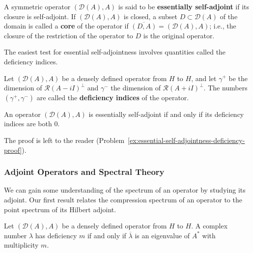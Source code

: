 \begin{Definition}
\label{def:essential-self-adjointness-and-core}
A symmetric operator $(\mathcal{D}(A),A)$ is said to be \textbf{essentially self-adjoint} if its closure is self-adjoint. If $(\mathcal{D}(A),A)$ is closed, a subset $D\subset\mathcal{D}(A)$ of the domain is called a \textbf{core} of the operator if $\overline{(D,A)}=(\mathcal{D}(A),A)$; i.e., the closure of the restriction of the operator to $D$ is the original operator.
\end{Definition}

The easiest test for essential self-adjointness involves quantities called the deficiency indices.

\begin{Definition}
\label{def:operator-deficiency-indices}
Let $(\mathcal{D}(A),A)$ be a densely defined operator from $H$ to $H$, and let $\gamma^+$ be the dimension of $\mathcal{R}(A-iI)^\perp$ and $\gamma^-$ the dimension of $\mathcal{R}(A+iI)^\perp$. The numbers $(\gamma^+,\gamma^-)$ are called the \textbf{deficiency indices} of the operator.
\end{Definition}

\begin{Theorem}
\label{thm:essential-self-adjointness-zero-deficiency}
An operator $(\mathcal{D}(A),A)$ is essentially self-adjoint if and only if its deficiency indices are both $0$.
\end{Theorem}

The proof is left to the reader (Problem~\ref{ex:essential-self-adjointness-deficiency-proof}).

\subsubsection{Adjoint Operators and Spectral Theory}\label{subsec:adjoint-operators-spectral-theory}

We can gain some understanding of the spectrum of an operator by studying its adjoint. Our first result relates the compression spectrum of an operator to the point spectrum of its Hilbert adjoint.

\begin{Theorem}
\label{thm:adjoint-deficiency-conjugate-eigenvalue}
Let $(\mathcal{D}(A),A)$ be a densely defined operator from $H$ to $H$. A complex number $\lambda$ has deficiency $m$ if and only if $\overline\lambda$ is an eigenvalue of $A^*$ with multiplicity $m$.
\end{Theorem}

